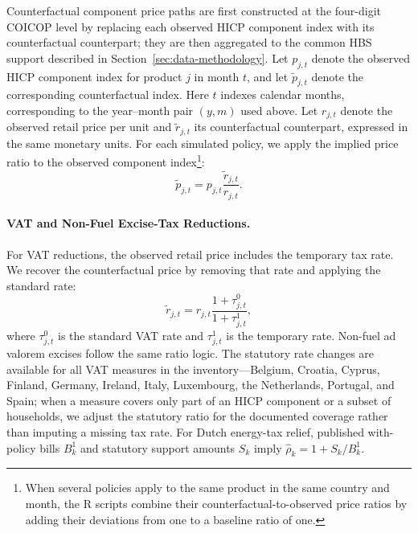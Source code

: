 \documentclass[11pt]{article}
\begin{document}
Counterfactual component price paths are first constructed at the four-digit COICOP level by replacing
each observed HICP component index with its counterfactual counterpart; they are then aggregated to
the common HBS support described in Section~\ref{sec:data-methodology}. Let $p_{j,t}$
denote the observed HICP component index for product $j$ in month $t$, and let $\widetilde p_{j,t}$
denote the corresponding counterfactual index. Here $t$ indexes calendar months, corresponding to
the year--month pair $(y,m)$ used above. Let $r_{j,t}$ denote the observed retail price per unit
and $\widetilde r_{j,t}$ its counterfactual counterpart, expressed in the same monetary units.
For each simulated policy, we apply the implied price ratio to the observed
component index\footnote{When several policies apply to the same product in the same country and month, the R scripts combine their counterfactual-to-observed price ratios by adding their deviations from one to a baseline ratio of one.}:
\begin{equation}
\widetilde p_{j,t}
=
p_{j,t}
\frac{\widetilde r_{j,t}}{r_{j,t}} .
\end{equation}

\paragraph{VAT and Non-Fuel Excise-Tax Reductions.}
For VAT reductions, the observed retail price includes the temporary tax rate. We recover the counterfactual price by removing that rate and applying the standard rate:
\begin{equation}
\widetilde r_{j,t}
=
r_{j,t}
\frac{1+\tau^{0}_{j,t}}{1+\tau^{1}_{j,t}},
\end{equation}
where $\tau^{0}_{j,t}$ is the standard VAT rate and $\tau^{1}_{j,t}$ is the temporary rate. Non-fuel ad valorem excises follow the same ratio logic. The statutory rate changes are available for all VAT measures in the inventory---Belgium, Croatia, Cyprus, Finland, Germany, Ireland, Italy, Luxembourg, the Netherlands, Portugal, and Spain;
when a measure covers only part of an HICP component or a subset of households,
we adjust the statutory ratio for the documented coverage rather than imputing a
missing tax rate. For Dutch energy-tax relief, published with-policy bills $B_k^{1}$ and statutory
support amounts $S_k$ imply $\widehat{\rho}_k=1+S_k/B_k^{1}$.

\end{document}
